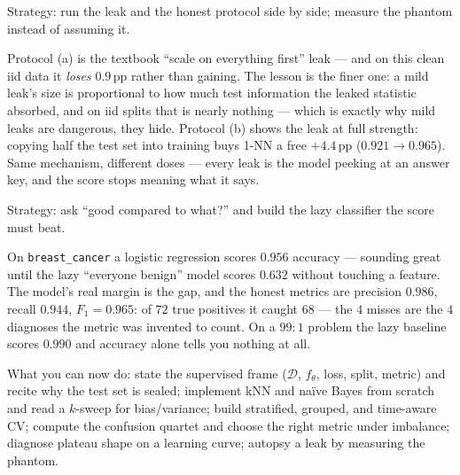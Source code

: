 



\begin{example}\label{ex:leakdemo}
Strategy: run the leak and the honest protocol side by side; measure the
phantom instead of assuming it.\par
\begin{solution}
Protocol (a) is the textbook ``scale on everything first'' leak --- and on
this clean iid data it \emph{loses} $0.9$\,pp rather than gaining. The
lesson is the finer one: a mild leak's size is proportional to how much
test information the leaked statistic absorbed, and on iid splits that is
nearly nothing --- which is exactly why mild leaks are dangerous, they
hide. Protocol (b) shows the leak at full strength: copying half the test
set into training buys 1-NN a free $+4.4$\,pp ($0.921 \to 0.965$). Same
mechanism, different doses --- every leak is the model peeking at an
answer key, and the score stops meaning what it says.
\end{solution}
\end{example}

\begin{example}\label{ex:imbalance}
Strategy: ask ``good compared to what?'' and build the lazy classifier the
score must beat.\par
\begin{solution}
On \texttt{breast\_cancer} a logistic regression scores $0.956$ accuracy ---
sounding great until the lazy ``everyone benign'' model scores $0.632$
without touching a feature. The model's real margin is the gap, and the
honest metrics are precision $0.986$, recall $0.944$, $F_1=0.965$: of
$72$ true positives it caught $68$ --- the $4$ misses are the $4$ diagnoses
the metric was invented to count. On a $99{:}1$ problem the lazy baseline
scores $0.990$ and accuracy alone tells you nothing at all.
\end{solution}
\end{example}

\begin{wins}
What you can now do: state the supervised frame ($\mathcal D$, $f_\theta$,
loss, split, metric) and recite why the test set is sealed; implement kNN
and na\"ive Bayes from scratch and read a $k$-sweep for bias/variance;
build stratified, grouped, and time-aware CV; compute the confusion quartet
and choose the right metric under imbalance; diagnose plateau shape on a
learning curve; autopsy a leak by measuring the phantom.
\end{wins}

